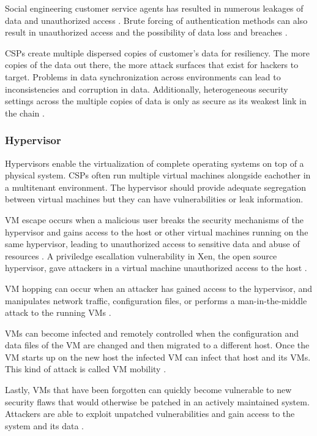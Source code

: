 \documentclass[12pt]{article}
\begin{document}
Social engineering customer service agents has resulted in numerous leakages of data and unauthorized access \cite{amazonse,icloudse}. Brute forcing of authentication methods can also result in unauthorized access and the possibility of data loss and breaches \cite{alertlogicsecurity}.

CSPs create multiple dispersed copies of customer's data for resiliency. The more copies of the data out there, the more attack surfaces that exist for hackers to target. Problems in data synchronization across environments can lead to inconsistencies and corruption in data. Additionally, heterogeneous security settings across the multiple copies of data is only as secure as its weakest link in the chain \cite{liu2015survey}.


\subsubsection{Hypervisor}

Hypervisors enable the virtualization of complete operating systems on top of a physical system. CSPs often run multiple virtual machines alongside eachother in a multitenant environment. The hypervisor should provide adequate segregation between virtual machines but they can have vulnerabilities or leak information.

VM escape occurs when a malicious user breaks the security mechanisms of the hypervisor and gains access to the host or other virtual machines running on the same hypervisor, leading to unauthorized access to sensitive data and abuse of resources \cite{owens2009securing}. A priviledge escallation vulnerability in Xen, the open source hypervisor, gave attackers in a virtual machine unauthorized access to the host \cite{xenprivilege}.

VM hopping can occur when an attacker has gained access to the hypervisor, and manipulates network traffic, configuration files, or performs a man-in-the-middle attack to the running VMs \cite{hyde2009survey}.

VMs can become infected and remotely controlled when the configuration and data files of the VM are changed and then migrated to a different host. Once the VM starts up on the new host the infected VM can infect that host and its VMs. This kind of attack is called VM mobility \cite{hyde2009survey,zhang2011virtualization}.

Lastly, VMs that have  been forgotten can quickly become vulnerable to new security flaws that would otherwise be patched in an actively maintained system. Attackers are able to exploit unpatched vulnerabilities and gain access to the system and its data \cite{jasti2010security}.
\end{document}
